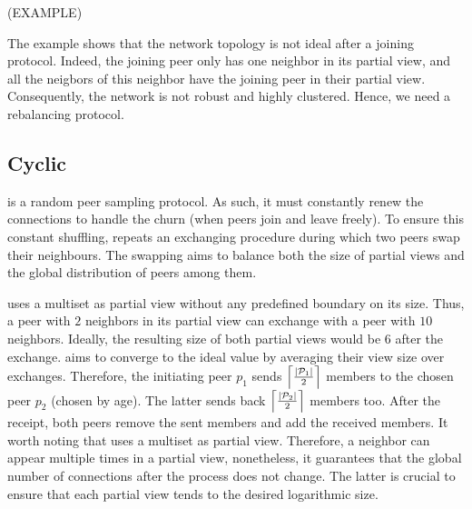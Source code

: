 (EXAMPLE)

The example shows that the network topology is not ideal after a joining
protocol. Indeed, the joining peer only has one neighbor in its partial view,
and all the neigbors of this neighbor have the joining peer in their partial
view. Consequently, the network is not robust and highly clustered. Hence, we
need a rebalancing protocol.

\subsection{Cyclic}

\SCAMPLON{} is a random peer sampling protocol. As such, it must constantly
renew the connections to handle the churn (when peers join and leave freely).
To ensure this constant shuffling, \SCAMPLON{} repeats an exchanging procedure
during which two peers swap their neighbours. The swapping aims to balance both
the size of partial views and the global distribution of peers among them.

\SCAMPLON{} uses a multiset as partial view without any predefined boundary on
its size. Thus, a peer with $2$ neighbors in its partial view can exchange with
a peer with $10$ neighbors. Ideally, the resulting size of both partial views
would be $6$ after the exchange. \SCAMPLON{} aims to converge to the ideal
value by averaging their view size over exchanges. Therefore, the initiating
peer $p_1$ sends $\left\lceil|\mathcal{P}_1|\over{2}\right\rceil$ members to
the chosen peer $p_2$ (chosen by age). The latter sends back
$\left\lceil|\mathcal{P}_2|\over{2}\right\rceil$ members too. After the
receipt, both peers remove the sent members and add the received members. It
worth noting that \SCAMPLON{} uses a multiset as partial view. Therefore, a
neighbor can appear multiple times in a partial view, nonetheless, it
guarantees that the global number of connections after the process does not
change. The latter is crucial to ensure that each partial view tends to the
desired logarithmic size.

